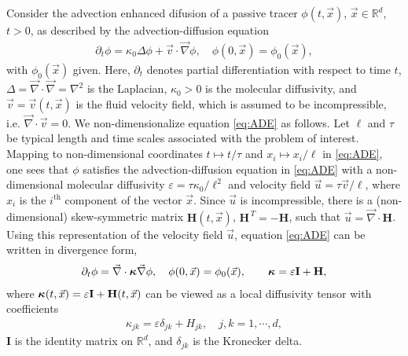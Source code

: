 \documentclass[11pt]{amsart}
\newcommand{\Hb}{\mathbf{H}}
\newcommand{\Ib}{\mathbf{I}}
\newcommand\bkappa{\mbox{\boldmath${\kappa}$}}
\begin{document}
Consider the advection enhanced difusion of a passive tracer
$\phi(t,\vec{x})$, $\vec{x}\in\mathbb{R}^d$, $t>0$, as described by the
advection-diffusion equation 
%
\begin{align}\label{eq:ADE}
  \partial_t\phi=\kappa_0\Delta \phi+\vec{v}\cdot\vec{\nabla}\phi, \quad
  \phi(0,\vec{x})=\phi_0(\vec{x}),
\end{align}
%
with $\phi_0(\vec{x})$ given. Here, $\partial_t$ denotes partial differentiation
with respect to time $t$, $\Delta=\vec{\nabla}\cdot\vec{\nabla}=\nabla^2$ is the Laplacian,
$\kappa_0>0$ is the molecular diffusivity, and $\vec{v}=\vec{v}(t,\vec{x})$
is the fluid velocity field, which is assumed to be incompressible,
i.e. $\vec{\nabla}\cdot\vec{v}=0$. We non-dimensionalize equation
\eqref{eq:ADE} as follows. Let $\ell$ and $\tau$ be typical length and time 
scales associated with the problem of interest. Mapping to
non-dimensional coordinates $t\mapsto t/\tau$ and $x_i\mapsto x_i/\ell$ in
\eqref{eq:ADE}, one sees that $\phi$ satisfies the advection-diffusion
equation in \eqref{eq:ADE} with a non-dimensional molecular
diffusivity $\varepsilon=\tau\kappa_0/\ell^2$ and velocity field $\vec{u}=\tau\vec{v}/\ell$,
where $x_i$ is the $i^{\text{th}}$ component of the vector
$\vec{x}$. Since $\vec{u}$ is incompressible, there is a
(non-dimensional) skew-symmetric matrix $\Hb(t,\vec{x})$,
$\Hb^{\,T}=-\Hb$, such that $\vec{u}=\vec{\nabla}\cdot\Hb$. 
Using this representation of the velocity field $\vec{u}$, equation
\eqref{eq:ADE} can be written in divergence form, 
%
\begin{align}\label{eq:ADE_Divergence}
  \partial_t\phi%
    =\vec{\nabla}\cdot\bkappa\vec{\nabla}\phi, \quad
    \phi(0,\vec{x})=\phi_0(\vec{x}),
    \qquad
    \bkappa=\varepsilon\Ib+\Hb,
\end{align}
%
where $\bkappa(t,\vec{x})=\varepsilon\Ib+\Hb(t,\vec{x})$ can be viewed as a local
diffusivity tensor with coefficients
%
\begin{align}\label{eq:kappa_coeff}
  \kappa_{jk}=\varepsilon\delta_{jk}+H_{jk},\quad j,k=1,\cdots,d,
\end{align}
%
$\Ib$ is the identity matrix on $\mathbb{R}^d$, and $\delta_{jk}$ is 
the Kronecker delta. 
\end{document}
